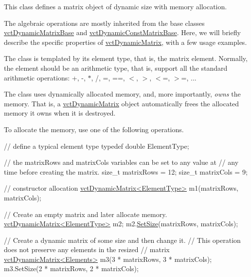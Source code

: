 This class defines a matrix object of dynamic size with memory allocation.

The algebraic operations are mostly inherited from the base classes \hyperlink{classvct_dynamic_matrix_base}{vct\+Dynamic\+Matrix\+Base} and \hyperlink{classvct_dynamic_const_matrix_base}{vct\+Dynamic\+Const\+Matrix\+Base}. Here, we will briefly describe the specific properties of \hyperlink{classvct_dynamic_matrix}{vct\+Dynamic\+Matrix}, with a few usage examples.


\begin{DoxyEnumerate}
\item The class is templated by its element type, that is, the matrix element. Normally, the element should be an arithmetic type, that is, support all the standard arithmetic operations\+: +, -\/, $\ast$, /, =, ==, $<$, $>$, $<$=, $>$=, ... 
\item The class uses dynamically allocated memory, and, more importantly, {\itshape owns} the memory. That is, a \hyperlink{classvct_dynamic_matrix}{vct\+Dynamic\+Matrix} object automatically frees the allocated memory it owns when it is destroyed. 
\item To allocate the memory, use one of the following operations. 
\begin{DoxyCode}
\textcolor{comment}{// define a typical element type}
\textcolor{keyword}{typedef} \textcolor{keywordtype}{double} ElementType;

\textcolor{comment}{// the matrixRows and matrixCols variables can be set to any value at}
\textcolor{comment}{// any time before creating the matrix.}
\textcolor{keywordtype}{size\_t} matrixRows = 12;
\textcolor{keywordtype}{size\_t} matrixCols = 9;

\textcolor{comment}{// constructor allocation}
\hyperlink{classvct_dynamic_matrix}{vctDynamicMatrix<ElementType>} m1(matrixRows, matrixCols);

\textcolor{comment}{// Create an empty matrix and later allocate memory.}
\hyperlink{classvct_dynamic_matrix}{vctDynamicMatrix<ElementType>} m2;
m2.\hyperlink{classvct_dynamic_matrix_a4ff773e41fa6605e6e2527822b1ae662}{SetSize}(matrixRows, matrixCols);

\textcolor{comment}{// Create a dynamic matrix of some size and then change it.}
\textcolor{comment}{// This operation does not preserve any elements in the resized}
\textcolor{comment}{// matrix}
\hyperlink{classvct_dynamic_matrix}{vctDynamicMatrix<Elements>} m3(3 * matrixRows, 3 * matrixCols);
m3.SetSize(2 * matrixRows, 2 * matrixCols);


\end{DoxyCode}
\end{DoxyEnumerate}
